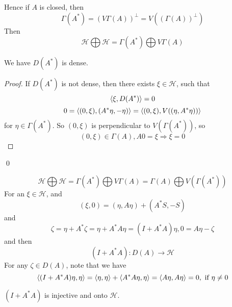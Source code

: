 Hence if $A$ is closed, then 
\begin{equation*}
    \Gamma(A^*)=(V\Gamma(A))^\perp=V((\Gamma(A))^\perp)
\end{equation*}
Then 
\begin{equation*}
    \mathcal{H}\bigoplus\mathcal{H}=\Gamma(A^*)\bigoplus V\Gamma(A)
\end{equation*}
\begin{proposition}
    We have $D(A^*)$ is dense.
\end{proposition}
\begin{proof}
    If $D(A^*)$ is not dense, then there exists $\xi\in\mathcal{H}$, such that
    \begin{equation*}
        \langle \xi, D(A^*)\rangle =0
    \end{equation*} 
    \begin{equation*}
        0=\langle(0,\xi), (A^*\eta,-\eta)\rangle=\langle (0,\xi), V((\eta, A^*\eta))\rangle
    \end{equation*}
    for $\eta\in\Gamma(A^*)$. So $(0,\xi)$ is perpendicular to $V(\Gamma(A^*))$, so 
    \begin{equation*}
        (0,\xi)\in\Gamma(A), A0=\xi\Rightarrow \xi=0
    \end{equation*}
\end{proof}
\qed

\begin{equation*}
    \mathcal{H}\bigoplus\mathcal{H}=\Gamma(A^*)\bigoplus V\Gamma(A)=\Gamma(A)\bigoplus V(\Gamma(A^*))
\end{equation*}
For an $\xi\in\mathcal{H}$, and 
\begin{equation*}
    (\xi, 0)=(\eta, A\eta)+(A^*S, -S)
\end{equation*}
and 
\begin{equation*}
    \zeta=\eta+A^*\zeta=\eta+A^*A\eta=(I+A^*A)\eta, 0=A\eta-\zeta
\end{equation*}
and then
\begin{equation*}
    (I+A^*A): D(A)\to\mathcal{H}
\end{equation*}
For any $\zeta\in D(A)$,  note that we have
\begin{equation*}
    \langle (I+A^*A)\eta,\eta\rangle=\langle \eta, \eta\rangle+\langle A^*A\eta, \eta\rangle=\langle A\eta, A\eta\rangle=0, \text{ if }\eta\neq 0
\end{equation*}
\begin{corollary}
    $(I+A^*A)$ is injective and onto $\mathcal{H}$.
\end{corollary}

